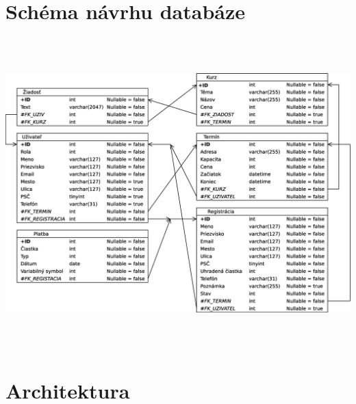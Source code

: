 \documentclass[12pt,a4paper,titlepage,final]{report}
\begin{document}
		\section{Schéma návrhu databáze}
		\begin{center}
			\captionsetup{type=figure}
			\includegraphics[height=12cm]{img/schema_db.eps}
		\end{center}
		
\newpage		
		
		\section{Architektura}		
		
\end{document}
